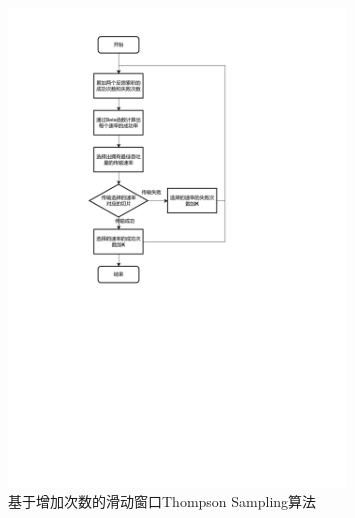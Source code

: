 \begin{figure}[h]
	\centering
	\includegraphics[width=0.8\textwidth]{figure/增加次数流程图.pdf}
	\caption{基于增加次数的滑动窗口Thompson Sampling算法}
	\label{增加次数流程图}
\end{figure}

